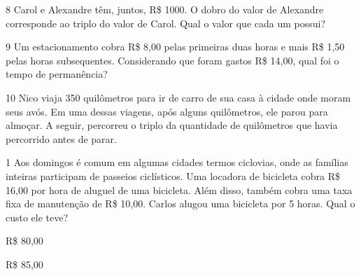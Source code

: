 \begin{escolha}
{{{%


\num{8} Carol e Alexandre têm, juntos, R\$ 1000. O dobro do
valor de Alexandre corresponde ao triplo do valor de Carol. Qual o valor
que cada um possui?



\num{9} Um estacionamento cobra R\$ 8,00 pelas primeiras duas horas e mais
R\$ 1,50 pelas horas subsequentes. Considerando que foram gastos R\$
14,00, qual foi o tempo de permanência?



\num{10} Nico viaja 350 quilômetros para ir de carro de sua casa à cidade
onde moram seus avós. Em uma dessas viagens, após alguns quilômetros,
ele parou para almoçar. A seguir, percorreu o triplo da quantidade de
quilômetros que havia percorrido antes de parar.




\num{1} Aos domingos é comum em algumas cidades termos ciclovias, onde as
famílias inteiras participam de passeios ciclísticos. Uma locadora de bicicleta
cobra R\$ 16,00 por hora de aluguel de uma bicicleta. Além disso,
também cobra uma taxa fixa de manutenção de R\$ 10,00. Carlos alugou uma
bicicleta por 5 horas. Qual o custo ele teve?

\begin{escolha}

  \item R\$ 80,00

  \item R\$ 85,00


\end{escolha}}}}
\end{escolha}
